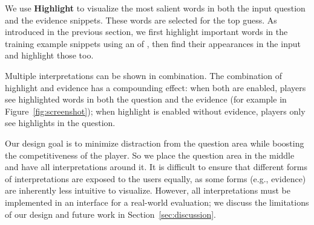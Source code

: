 \begin{figure}[H]
\centering
{}
\end{figure}

We use \textbf{Highlight} to visualize the most salient words in both
the input question and the evidence snippets. These words are selected
for the top guess. As introduced in the previous section, we first
highlight important words in the training example snippets using an
 of , then find their appearances in the input and
highlight those too. 


Multiple interpretations can be shown in combination. The
combination of highlight and evidence has a compounding effect: when
both are enabled, players see highlighted words in both the question
and the evidence (for example in Figure~\ref{fig:screenshot});
when highlight is enabled without evidence, players only see
highlights in the question.


Our design goal is to minimize distraction from the
question area while boosting the competitiveness of the player. So we place
the question area in the middle and have all interpretations around it.
It is difficult to ensure that different forms of
interpretations are exposed to the users equally, as some forms (e.g.,
evidence) are inherently less intuitive to visualize. However,
all interpretations must be implemented in an interface for a
real-world evaluation; we discuss the limitations of our design and
future work in Section~\ref{sec:discussion}.
